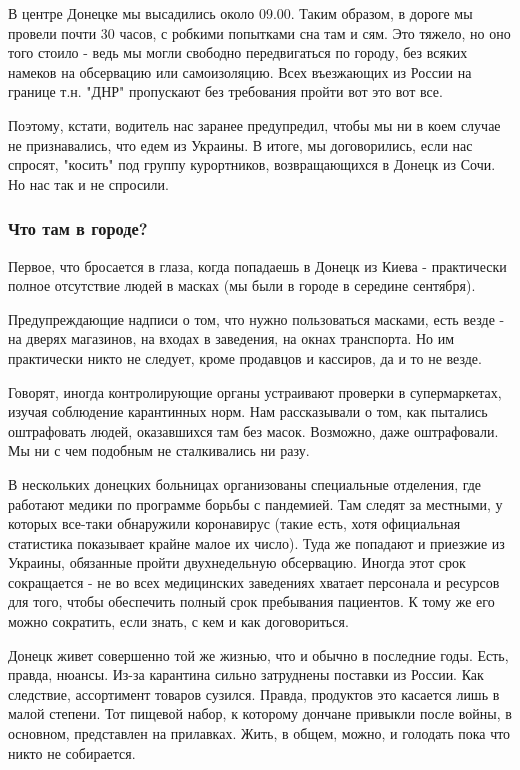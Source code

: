 В центре Донецке мы высадились около 09.00. Таким образом, в дороге мы провели
почти 30 часов, с робкими попытками сна там и сям. Это тяжело, но оно того
стоило - ведь мы могли свободно передвигаться по городу, без всяких намеков на
обсервацию или самоизоляцию. Всех въезжающих из России на границе т.н. "ДНР"
пропускают без требования пройти вот это вот все.

Поэтому, кстати, водитель нас заранее предупредил, чтобы мы ни в коем случае не
признавались, что едем из Украины. В итоге, мы договорились, если нас спросят,
"косить" под группу курортников, возвращающихся в Донецк из Сочи. Но нас так и
не спросили.

\subsubsection{Что там в городе? }

Первое, что бросается в глаза, когда попадаешь в Донецк из Киева - практически
полное отсутствие людей в масках (мы были в городе в середине сентября). 

Предупреждающие надписи о том, что нужно пользоваться масками, есть везде - на
дверях магазинов, на входах в заведения, на окнах транспорта. Но им практически
никто не следует, кроме продавцов и кассиров, да и то не везде.

Говорят, иногда контролирующие органы устраивают проверки в супермаркетах,
изучая соблюдение карантинных норм. Нам рассказывали о том, как пытались
оштрафовать людей, оказавшихся там без масок. Возможно, даже оштрафовали. Мы ни
с чем подобным не сталкивались ни разу.

В нескольких донецких больницах организованы специальные отделения, где
работают медики по программе борьбы с пандемией. Там следят за местными, у
которых все-таки обнаружили коронавирус (такие есть, хотя официальная
статистика показывает крайне малое их число). Туда же попадают и приезжие из
Украины, обязанные пройти двухнедельную обсервацию. Иногда этот срок
сокращается - не во всех медицинских заведениях хватает персонала и ресурсов
для того, чтобы обеспечить полный срок пребывания пациентов. К тому же его
можно сократить, если знать, с кем и как договориться.

Донецк живет совершенно той же жизнью, что и обычно в последние годы. Есть,
правда, нюансы. Из-за карантина сильно затруднены поставки из России. Как
следствие, ассортимент товаров сузился. Правда, продуктов это касается лишь в
малой степени. Тот пищевой набор, к которому дончане привыкли после войны, в
основном, представлен на прилавках. Жить, в общем, можно, и голодать пока что
никто не собирается.


